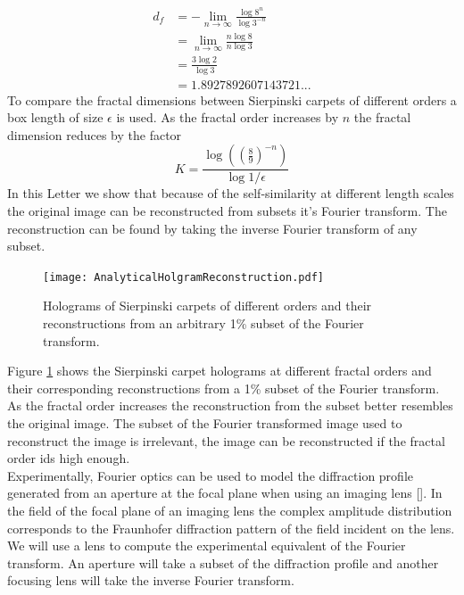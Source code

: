 \begin{equation}
\begin{split}
d_f &= -\lim_{n\rightarrow\infty}\frac{\log 8^n}{\log 3^{-n}}\\
&=\lim_{n\rightarrow\infty}\frac{n\log 8}{n\log 3}\\
&=\frac{3\log 2}{\log 3}\\
&=1.8927892607143721...
\end{split}
\end{equation}
To compare the fractal dimensions between Sierpinski carpets of different orders a box length of size $\epsilon$ is used. As the fractal order increases by $n$ the fractal dimension reduces by the factor 
\begin{equation}
K = \frac{\log((\frac{8}{9})^{-n})}{\log 1/\epsilon}
\end{equation}
In this Letter we show that because of the self-similarity at different length scales the original image can be reconstructed from subsets it's Fourier transform. The reconstruction can be found by taking the inverse Fourier transform of any subset. 
\begin{figure}[b!]
\texttt{[image: AnalyticalHolgramReconstruction.pdf]}
\caption{Holograms of Sierpinski carpets of different orders and their reconstructions from an arbitrary 1\% subset of the Fourier transform.}
\label{AnalRecon}
\end{figure}
Figure \ref{AnalRecon} shows the Sierpinski carpet holograms at different fractal orders and their corresponding reconstructions from a 1\% subset of the Fourier transform. As the fractal order increases the reconstruction from the subset better resembles the original image. The subset of the Fourier transformed image used to reconstruct the image is irrelevant, the image can be reconstructed if the fractal order ids high enough.\\
Experimentally, Fourier optics can be used to model the diffraction profile generated from an aperture at the focal plane when using an imaging lens [\cite{Goodman}]. In the field of the focal plane of an imaging lens the complex amplitude distribution corresponds to the Fraunhofer diffraction pattern of the field incident on the lens. We will use a lens to compute the experimental equivalent of the Fourier transform. An aperture will take a subset of the diffraction profile and another focusing lens will take the inverse Fourier transform.

